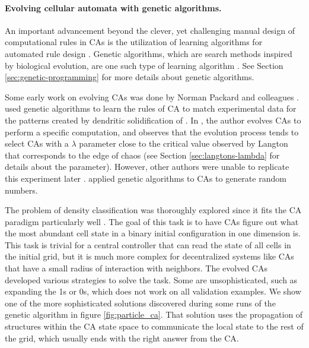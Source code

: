 \paragraph{Evolving cellular automata with genetic algorithms.}
An important advancement beyond the clever, yet challenging manual design of 
computational rules in \acp{CA} is the utilization of learning algorithms 
for automated rule design \parencite{mitchellEvolvingCellularAutomata1996}. 
Genetic algorithms, which are search methods inspired 
by biological evolution, are one such type of
learning algorithm \parencite{bookerClassifierSystemsGenetic1989}. See Section
\ref{sec:genetic-programming} for more details about genetic algorithms.

Some early work on evolving \acp{CA} was done by Norman Packard and colleagues
\parencite{packardAdaptationEdgeChaos1988,
  richardsExtractingCellularAutomaton1990}.
\textcite{richardsExtractingCellularAutomaton1990} used genetic algorithms to
learn the rules of \ac{CA} to match experimental data for the patterns created
by dendritic solidification of . In
\parencite{packardAdaptationEdgeChaos1988}, the author evolves \acp{CA} to
perform a specific computation, and observes that the evolution process tends to
select \acp{CA} with a $\lambda$ parameter close to the critical value observed by
Langton that corresponds to the edge of chaos (see Section
\ref{sec:langtons-lambda} for details about the parameter). However, other
authors were unable to replicate this experiment later
\parencite{mitchellRevisitingEdgeChaos1993}.
\textcite{kozaEvolutionSubsumptionUsing1992} applied genetic algorithms to
\acp{CA} to generate random numbers.

The problem of density classification was thoroughly explored since it fits the
\ac{CA} paradigm particularly well \parencite{mitchellRevisitingEdgeChaos1993,
  mitchellEvolvingCellularAutomata1994,
  crutchfieldEvolutionEmergentComputation1995, dasGeneticAlgorithmDiscovers1994,
  sipperCoevolvingNonuniformCellular1996, andreDiscoveryGeneticProgramming1996}.
The goal of this task is to have \acp{CA} figure out what the most abundant cell
state in a binary initial configuration in one dimension is. This task is trivial
for a central controller that can read the state of all cells in the initial
grid, but it is much more complex for decentralized systems like \acp{CA}
that have a small radius of interaction with neighbors. The evolved \acp{CA}
developed various strategies to solve the task. Some are unsophisticated, such
as expanding the 1s or 0s, which does not work on all validation examples. We
show one of the more sophisticated solutions discovered during some runs of the
genetic algorithm in figure \ref{fig:particle_ca}. That solution uses the
propagation of structures within the \ac{CA} state space to communicate the
local state to the rest of the grid, which usually ends with the right answer
from the \ac{CA}.

